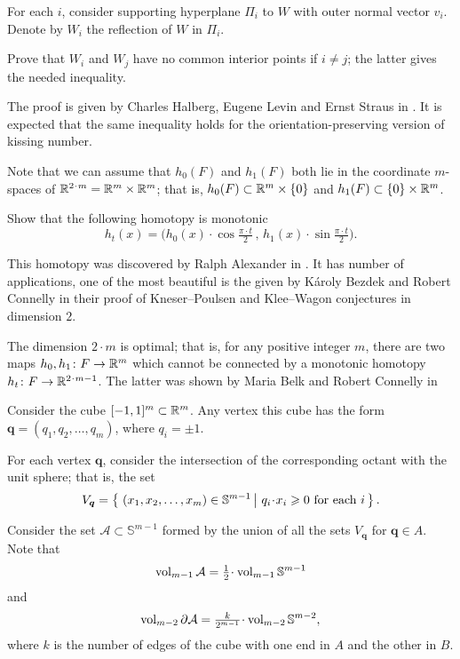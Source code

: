 For each $i$,
consider supporting hyperplane $\Pi_i$
to $W$
with outer normal vector $v_i$.
Denote by $W_i$ the reflection of $W$ in $\Pi_i$.

Prove that $W_i$ and $W_j$ have no common interior points if $i\ne j$;
the latter gives the needed inequality.
\qeds

The proof is given by 
Charles Halberg, 
Eugene Levin 
and Ernst Straus 
in \cite{halberg-levin-straus}.
It is expected that the same inequality holds for the orientation-preserving version of kissing number.



Note that we can assume
that $h_0(F)$ and $h_1(F)$ both lie in the coordinate $m$-spaces of $\RR^{2\cdot m}=\RR^m\times \RR^m$;
that is,
$h_0(F)\z\subset\RR^m\times\{0\}$
and $h_1(F)\subset  \{0\}\times\mathbb{R}^m$.

Show that the following homotopy is monotonic
\[h_t(x)=\bigl(h_0(x)\cdot \cos\tfrac{\pi\cdot t}2
\,,\,
 h_1(x)\cdot\sin\tfrac{\pi\cdot t}{2}\bigr).\] 
\qedsf

This homotopy was discovered by Ralph Alexander in \cite{ralexander}.
It has number of applications, 
one of the most beautiful is the given 
by K\'aroly Bezdek 
and Robert Connelly \cite{bezdek-connelly} 
in their proof of 
Kneser--Poulsen  
and Klee--Wagon conjectures in dimension $2$.

The dimension $2\cdot m$ is optimal;
that is, for any positive integer $m$,
there are two maps $h_0,h_1\colon F\to \mathbb{R}^m$ which cannot be connected by a monotonic homotopy $h_t\:F\to\RR^{2\cdot m-1}$.
The latter was shown by Maria Belk and Robert Connelly in \cite{belk-connelly}



Consider the cube $[-1,1]^m\subset \mathbb{R}^m$.
Any vertex this cube has the form $\bm{q}=(q_1,q_2,\dots,q_m)$,
where  $q_i=\pm1$.

For each vertex $\bm{q}$,
consider the intersection of the corresponding octant with the unit sphere;
that is, the set
\[V_{\bm{q}}=\set{(x_1,x_2,\dots,x_m)\in\mathbb{S}^{m-1}}{q_i\cdot x_i\ge 0\ \text{for each}\ i}.\]

Consider the set $\mathcal{A}\subset\mathbb{S}^{m-1}$
formed by the union of all the sets $V_{\bm{q}}$ for $\bm{q}\in A$.
Note that 
\[\vol_{m-1}\mathcal{A}=\tfrac12\cdot\vol_{m-1}\mathbb{S}^{m-1}\]
and 
\[\vol_{m-2}\partial\mathcal{A}
=
\tfrac k{2^{m-1}}\cdot\vol_{m-2}\mathbb{S}^{m-2},\]
where $k$ is the number of edges of the cube with one end in $A$ and the other in $B$.

